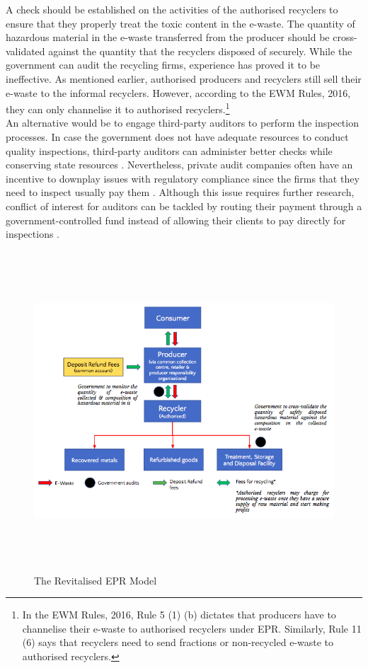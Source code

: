 \documentclass[a4paper, 12pt]{article}
\begin{document}
                    A check should be established on the activities of the authorised recyclers to ensure that they properly treat the toxic content in the e-waste. The quantity of hazardous material in the e-waste transferred from the producer should be cross-validated against the quantity that the recyclers disposed of securely. While the government can audit the recycling firms, experience has proved it to be ineffective. As mentioned earlier, authorised producers and recyclers still sell their e-waste to the informal recyclers. However, according to the EWM Rules, 2016, they can only channelise it to authorised recyclers.\footnote{In the EWM Rules, 2016, Rule 5 (1) (b) dictates that producers have to channelise their e-waste to authorised recyclers under EPR. Similarly, Rule 11 (6) says that recyclers need to send fractions or non-recycled e-waste to authorised recyclers.}\\
                    
                    An alternative would be to engage third-party auditors to perform the inspection processes. In case the government does not have adequate resources to conduct quality inspections, third-party auditors can administer better checks while conserving state resources \parencite{mcallisterreport}. Nevertheless, private audit companies often have an incentive to downplay issues with regulatory compliance since the firms that they need to inspect usually pay them \parencite{shorttoffelpaper}. Although this issue requires further research, conflict of interest for auditors can be tackled by routing their payment through a government-controlled fund instead of allowing their clients to pay directly for inspections \parencite{duflopaper}.\\

                     
                    \begin{figure}[H]
                    	\centering
                    	\includegraphics[height = 4.7in]{fig4.png}
                    	\caption[Optional Caption]{The Revitalised EPR Model}
                    \end{figure}
                    
\end{document}
